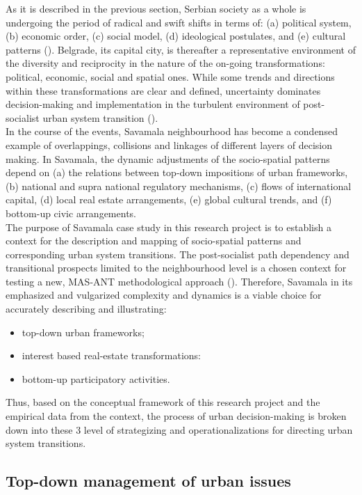 \documentclass[11pt]{report}
\begin{document}
As it is described in the previous section, Serbian society as a whole is undergoing the period of radical and swift shifts in terms of: (a) political system,
(b) economic order,
(c) social model,
(d) ideological postulates, and
(e) cultural patterns (\href{}{\citealt{petrovic_cities_2009}}).
Belgrade, its capital city, is thereafter a representative environment of the diversity and reciprocity in the nature of the on-going transformations: political, economic, social and spatial ones.
While some trends and directions within these transformations are clear and defined, uncertainty dominates decision-making and implementation in the turbulent environment of post-socialist urban system transition (\cite{(Nedovic-Budic, 2001)}).
\\
In the course of the events, Savamala neighbourhood has become a condensed example of overlappings, collisions and linkages of different layers of decision making.
In Savamala, the dynamic adjustments of the socio-spatial patterns depend on
(a) the relations between top-down impositions of urban frameworks, (b) national and supra national regulatory mechanisms,
(c) flows of international capital,
(d) local real estate arrangements,
(e) global cultural trends, and
(f) bottom-up civic arrangements.
\\
The purpose of Savamala case study in this research project is to establish a context for the description and mapping of socio-spatial patterns and corresponding urban system transitions.
The post-socialist path dependency and transitional prospects limited to the neighbourhood level is a chosen context for testing a new, MAS-ANT methodological approach (\cite{Yin, 2009}).
Therefore, Savamala in its emphasized and vulgarized complexity and dynamics is a viable choice for accurately describing and illustrating:
\begin{itemize}
\item top-down urban frameworks;
\item interest based real-estate transformations:
\item bottom-up participatory activities.
\end{itemize}

Thus, based on the conceptual framework of this research project and the empirical data from the context, the process of urban decision-making is broken down into these 3 level of strategizing and operationalizations for directing urban system transitions. 

\subsection{Top-down management of urban issues}
\end{document}
